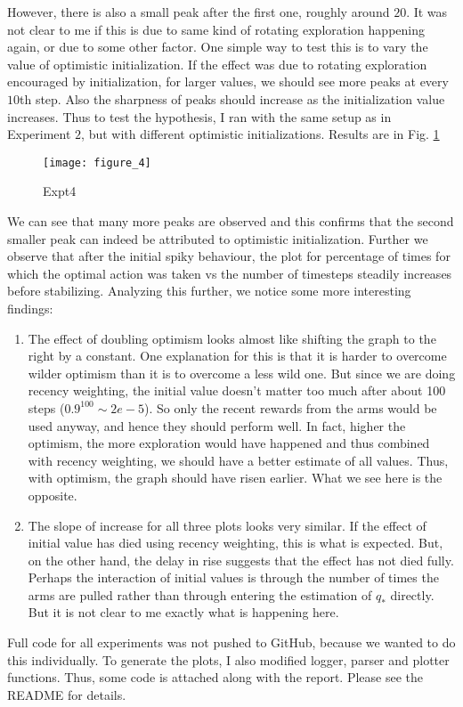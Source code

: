 \documentclass{article}
\begin{document}
However, there is also a small peak after the first one, roughly around $20$. It was not clear to me if this is due to same kind of rotating exploration happening again, or due to some other factor. One simple way to test this is to vary the value of optimistic initialization. If the effect was due to rotating exploration encouraged by initialization, for larger values, we should see more peaks at every $10$th step. Also the sharpness of peaks should increase as the initialization value increases. Thus to test the hypothesis, I ran with the same setup as in Experiment $2$, but with different optimistic initializations. Results are in Fig. \ref{expt4}

\begin{figure}
    \texttt{[image: figure\_4]}
    \caption{Expt4}
    \label{expt4}
\end{figure}

We can see that many more peaks are observed and this confirms that the second smaller peak can indeed be attributed to optimistic initialization. Further we observe that after the initial spiky behaviour, the plot for percentage of times for which the optimal action was taken vs the number of timesteps steadily increases before stabilizing. Analyzing this further, we notice some more interesting findings:
\begin{enumerate}
    \item The effect of doubling optimism looks almost like shifting the graph to the right by a constant. One explanation for this is that it is harder to overcome wilder optimism than it is to overcome a less wild one. But since we are doing recency weighting, the initial value doesn’t matter too much after about 100 steps ($0.9^{100} \sim 2e-5$). So only the recent rewards from the arms would be used anyway, and hence they should perform well. In fact, higher the optimism, the more exploration would have happened and thus combined with recency weighting, we should have a better estimate of all values. Thus, with optimism, the graph should have risen earlier. What we see here is the opposite.
    \item The slope of increase for all three plots looks very similar. If the effect of initial value has died using recency weighting, this is what is expected. But, on the other hand, the delay in rise suggests that the effect has not died fully. Perhaps the interaction of initial values is through the number of times the arms are pulled rather than through entering the estimation of $q_*$ directly. But it is not clear to me exactly what is happening here.
\end{enumerate}

Full code for all experiments was not pushed to GitHub, because we wanted to do this individually. To generate the plots, I also modified logger, parser and plotter functions. Thus, some code is attached along with the report. Please see the README for details.
\end{document}
